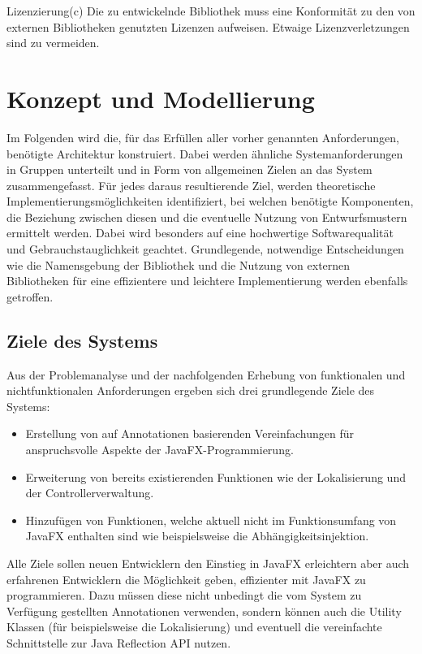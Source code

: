 \begin{nreq}{Lizenzierung}(c)
	Die zu entwickelnde Bibliothek muss eine Konformität zu den von externen Bibliotheken genutzten Lizenzen aufweisen. Etwaige Lizenzverletzungen sind zu vermeiden.
\end{nreq}
\section{Konzept und Modellierung}
\label{konzept_und_modellierung}
Im Folgenden wird die, für das Erfüllen aller vorher genannten Anforderungen, benötigte Architektur konstruiert. Dabei werden ähnliche Systemanforderungen in Gruppen unterteilt und in Form von allgemeinen Zielen an das System zusammengefasst. Für jedes daraus resultierende Ziel, werden theoretische Implementierungsmöglichkeiten identifiziert, bei welchen benötigte Komponenten, die Beziehung zwischen diesen und die eventuelle Nutzung von Entwurfsmustern ermittelt werden. Dabei wird besonders auf eine hochwertige Softwarequalität und Gebrauchstauglichkeit geachtet. Grundlegende, notwendige Entscheidungen wie die Namensgebung der Bibliothek und die Nutzung von externen Bibliotheken für eine effizientere und leichtere Implementierung werden ebenfalls getroffen. 
\subsection{Ziele des Systems}
Aus der Problemanalyse und der nachfolgenden Erhebung von funktionalen und nichtfunktionalen Anforderungen ergeben sich drei grundlegende Ziele des Systems:
\begin{itemize}
	\item Erstellung von auf Annotationen basierenden Vereinfachungen für anspruchsvolle Aspekte der JavaFX-Programmierung.
	\item Erweiterung von bereits existierenden Funktionen wie der Lokalisierung und der Controllerverwaltung.
	\item Hinzufügen von Funktionen, welche aktuell nicht im Funktionsumfang von JavaFX enthalten sind wie beispielsweise die Abhängigkeitsinjektion.
\end{itemize}
Alle Ziele sollen neuen Entwicklern den Einstieg in JavaFX erleichtern aber auch erfahrenen Entwicklern die Möglichkeit geben, effizienter mit JavaFX zu programmieren. Dazu müssen diese nicht unbedingt die vom System zu Verfügung gestellten Annotationen verwenden, sondern können auch die Utility Klassen (für beispielsweise die Lokalisierung) und eventuell die vereinfachte Schnittstelle zur Java Reflection API nutzen.
